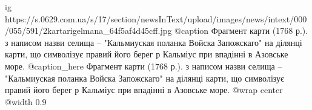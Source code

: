  
 
 
 
 

\ifcmt
  ig https://s.0629.com.ua/s/17/section/newsInText/upload/images/news/intext/000/055/591/2kartarigelmana_64f5af4d45cff.jpg
	@caption Фрагмент карти (1768 р.). з написом назви селища – "Кальмиуская поланка Войска Запожскаго" на ділянці карти, що символізує правий його берег р Кальміус при впадінні в Азовське море.
	@caption_here Фрагмент карти (1768 р.). з написом назви селища – "Кальмиуская поланка Войска Запожскаго" на ділянці карти, що символізує правий його берег р Кальміус при впадінні в Азовське море.
  @wrap center
  @width 0.9
\fi
